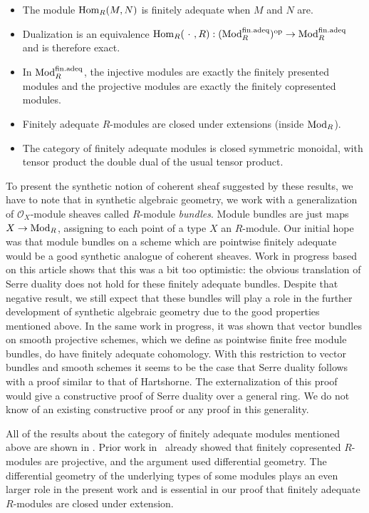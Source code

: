 \begin{itemize}
\item The module $\mathrm{Hom}_R(M, N)$ is finitely adequate when $M$ and $N$ are.
\item Dualization is an equivalence $\mathrm{Hom}_R(\ \cdot\ , R) : (\textup{Mod}_{R}^{\mathrm{fin.adeq}})^{\textup{op}} \to \textup{Mod}_{R}^{\mathrm{fin.adeq}}$ and is therefore exact.
\item In $\textup{Mod}_{R}^{\mathrm{fin.adeq}}$, the injective modules are exactly the finitely presented modules and the projective modules are exactly the finitely copresented modules.
\item Finitely adequate $R$-modules are closed under extensions (inside $\textup{Mod}_{R}$).
\item The category of finitely adequate modules is closed symmetric monoidal, with tensor product the double dual of the usual tensor product.
\end{itemize}

To present the synthetic notion of coherent sheaf suggested by these results,
we have to note that in synthetic algebraic geometry, we work with a generalization of $\mathcal O_X$-module sheaves called $R$-module \emph{bundles}.
Module bundles are just maps $X\to \textup{Mod}_{R}$, assigning to each point of a type $X$ an $R$-module. Our initial hope was that module bundles on a scheme which are pointwise finitely adequate would be a good synthetic analogue of coherent sheaves. Work in progress based on this article shows that this was a bit too optimistic: the obvious translation of Serre duality does not hold for these finitely adequate bundles. Despite that negative result, we still expect that these bundles will play a role in the further development of synthetic algebraic geometry due to the good properties mentioned above. In the same work in progress, it was shown that vector bundles on smooth projective schemes, which we define as pointwise finite free module bundles, do have finitely adequate cohomology. With this restriction to vector bundles and smooth schemes it seems to be the case that Serre duality follows with a proof similar to that of Hartshorne. The externalization of this proof would give a constructive proof of Serre duality over a general ring. We do not know of an existing constructive proof or any proof in this generality.

All of the results about the category of finitely adequate modules mentioned above are shown in . Prior work in~\cite{diffgeo-article} already showed that finitely copresented $R$-modules are projective, and the argument used differential geometry. The differential geometry of the underlying types of some modules plays an even larger role in the present work and is essential in our proof that finitely adequate $R$-modules are closed under extension.

